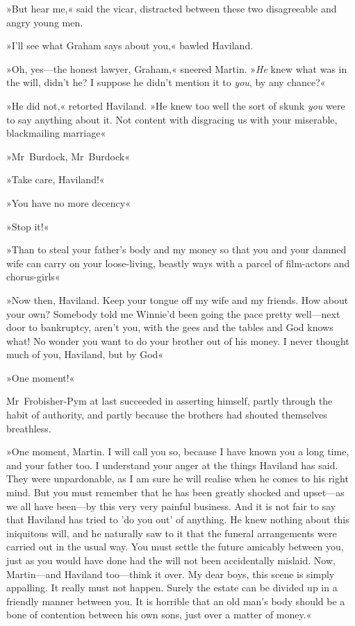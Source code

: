 »But hear me,« said the vicar, distracted between these two disagreeable and angry young men.

»I'll see what Graham says about you,« bawled Haviland.

»Oh, yes—the honest lawyer, Graham,« sneered Martin. »\textit{He} knew what was in the will, didn't he? I suppose he didn't mention it to \textit{you}, by any chance?«

»He did not,« retorted Haviland. »He knew too well the sort of skunk \textit{you} were to say anything about it. Not content with disgracing us with your miserable, blackmailing marriage\longdash«

»Mr~Burdock, Mr~Burdock\longdash«

»Take care, Haviland!«

»You have no more decency\longdash«

»Stop it!«

»Than to steal your father's body and my money so that you and your damned wife can carry on your loose-living, beastly ways with a parcel of film-actors and chorus-girls\longdash«

»Now then, Haviland. Keep your tongue off my wife and my friends. How about your own? Somebody told me Winnie'd been going the pace pretty well—next door to bankruptcy, aren't you, with the gees and the tables and God knows what! No wonder you want to do your brother out of his money. I never thought much of you, Haviland, but by God\longdash«

»One moment!«

Mr~Frobisher-Pym at last succeeded in asserting himself, partly through the habit of authority, and partly because the brothers had shouted themselves breathless.

»One moment, Martin. I will call you so, because I have known you a long time, and your father too. I understand your anger at the things Haviland has said. They were unpardonable, as I am sure he will realise when he comes to his right mind. But you must remember that he has been greatly shocked and upset—as we all have been—by this very very painful business. And it is not fair to say that Haviland has tried to 'do you out' of anything. He knew nothing about this iniquitous will, and he naturally saw to it that the funeral arrangements were carried out in the usual way. You must settle the future amicably between you, just as you would have done had the will not been accidentally mislaid. Now, Martin—and Haviland too—think it over. My dear boys, this scene is simply appalling. It really must not happen. Surely the estate can be divided up in a friendly manner between you. It is horrible that an old man's body should be a bone of contention between his own sons, just over a matter of money.«

